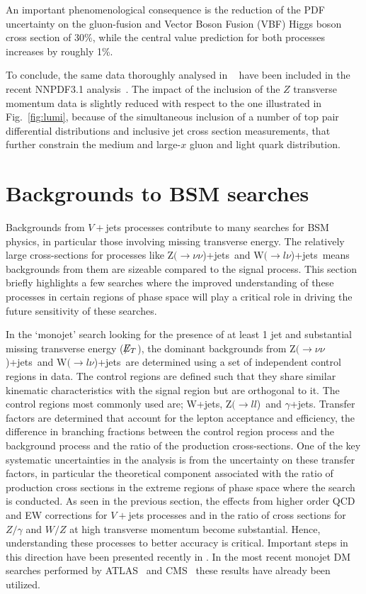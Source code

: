 \documentclass[a4paper,11pt,notoc]{article}
\newcommand{\Zll}   {\mbox{${\mathrm Z}(\rightarrow l l$)}}
\newcommand{\Znunuj}   {\mbox{${\mathrm Z}(\rightarrow\nu \nu$)+jets}}
\newcommand{\Wlnuj}   {\mbox{${\mathrm W}(\rightarrow l\nu$)+jets}}
\newcommand{\met}{\ensuremath{\not\!\!E_T}}
\begin{document}
%
An important phenomenological consequence is the reduction of the PDF uncertainty on the  gluon-fusion  and Vector Boson 
Fusion (VBF) Higgs boson cross section of 30\%, while the central value 
prediction for both processes increases by roughly 1\%.

To conclude, the same data thoroughly analysed in ~\cite{Boughezal:2017nla}
have been included in the recent NNPDF3.1 analysis~\cite{Ball:2017nwa}.
The impact of the inclusion of the $Z$ transverse momentum data is slightly reduced with
respect to the one illustrated in Fig.~\ref{fig:lumi},
because of the simultaneous inclusion of
a number of top pair differential distributions
and inclusive jet cross section measurements, that further 
constrain the medium and large-$x$ gluon and light quark distribution.

\section{Backgrounds to BSM searches}
Backgrounds from $V+$jets processes contribute to many searches for BSM physics, in particular those involving missing transverse energy. The relatively large cross-sections for processes like \Znunuj\ and \Wlnuj\ means backgrounds from them are sizeable compared to the signal process. This section briefly highlights a few searches where the improved understanding of these processes in certain regions of phase space will play a critical role in driving the future sensitivity of these searches. 

In the `monojet' search looking for the presence of at least 1 jet and substantial missing transverse energy (\met), the dominant backgrounds from \Znunuj\ and \Wlnuj\ are determined using a set of independent control regions in data. The control regions are defined such that they share similar kinematic characteristics with the signal region but are orthogonal to it. The control regions most commonly used are; W+jets, \Zll\ and $\gamma$+jets. Transfer factors are determined that account for the lepton acceptance and efficiency, the difference in branching fractions between the control region process and the background process and the ratio of the production cross-sections. One of the key systematic uncertainties in the analysis is from the uncertainty on these transfer factors, in particular the theoretical component associated with the ratio of production cross sections in the extreme regions of phase space where the search is conducted. As seen in the previous section, the effects from higher order QCD and EW corrections for $V+$jets processes and in the ratio of cross sections for $Z/\gamma$ and $W/Z$ at high transverse momentum become substantial. Hence, understanding these processes to better accuracy is critical. Important steps in this direction
have been presented recently in \cite{Lindert:2017olm}. In the most recent monojet DM searches performed by ATLAS~\cite{ATLAS:2017dnw} and CMS~\cite{CMS:2017tbk} these results have already been utilized.
\end{document}

